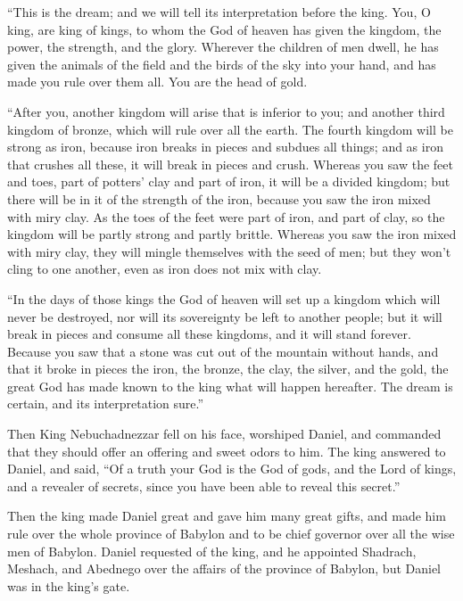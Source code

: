 \myverse{}“This is the dream; and we will tell its interpretation before the king. \myverse{}You, O king, are king of kings, to whom the God of heaven has given the kingdom, the power, the strength, and the glory. \myverse{}Wherever the children of men dwell, he has given the animals of the field and the birds of the sky into your hand, and has made you rule over them all. You are the head of gold.


\myverse{}“After you, another kingdom will arise that is inferior to you; and another third kingdom of bronze, which will rule over all the earth. \myverse{}The fourth kingdom will be strong as iron, because iron breaks in pieces and subdues all things; and as iron that crushes all these, it will break in pieces and crush. \myverse{}Whereas you saw the feet and toes, part of potters’ clay and part of iron, it will be a divided kingdom; but there will be in it of the strength of the iron, because you saw the iron mixed with miry clay. \myverse{}As the toes of the feet were part of iron, and part of clay, so the kingdom will be partly strong and partly brittle. \myverse{}Whereas you saw the iron mixed with miry clay, they will mingle themselves with the seed of men; but they won’t cling to one another, even as iron does not mix with clay.


\myverse{}“In the days of those kings the God of heaven will set up a kingdom which will never be destroyed, nor will its sovereignty be left to another people; but it will break in pieces and consume all these kingdoms, and it will stand forever. \myverse{}Because you saw that a stone was cut out of the mountain without hands, and that it broke in pieces the iron, the bronze, the clay, the silver, and the gold, the great God has made known to the king what will happen hereafter. The dream is certain, and its interpretation sure.”


\myverse{}Then King Nebuchadnezzar fell on his face, worshiped Daniel, and commanded that they should offer an offering and sweet odors to him. \myverse{}The king answered to Daniel, and said, “Of a truth your God is the God of gods, and the Lord of kings, and a revealer of secrets, since you have been able to reveal this secret.”



\myverse{}Then the king made Daniel great and gave him many great gifts, and made him rule over the whole province of Babylon and to be chief governor over all the wise men of Babylon. \myverse{}Daniel requested of the king, and he appointed Shadrach, Meshach, and Abednego over the affairs of the province of Babylon, but Daniel was in the king’s gate.


